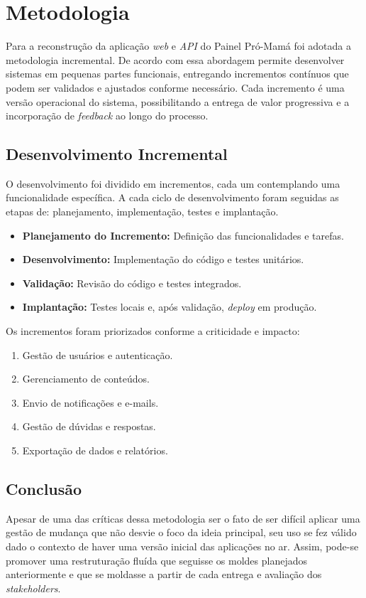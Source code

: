 \chapter{Metodologia}

Para a reconstrução da aplicação \emph{web} e \emph{API} do Painel Pró-Mamá foi adotada a metodologia incremental. De acordo com  essa abordagem permite desenvolver sistemas em pequenas partes funcionais, entregando incrementos contínuos que podem ser validados e ajustados conforme necessário. Cada incremento é uma versão operacional do sistema, possibilitando a entrega de valor progressiva e a incorporação de \emph{feedback} ao longo do processo.

\section{Desenvolvimento Incremental}

O desenvolvimento foi dividido em incrementos, cada um contemplando uma funcionalidade específica. A cada ciclo de desenvolvimento foram seguidas as etapas de: planejamento, implementação, testes e implantação.

\begin{itemize}
  \item \textbf{Planejamento do Incremento:} Definição das funcionalidades e tarefas.
  \item \textbf{Desenvolvimento:} Implementação do código e testes unitários.
  \item \textbf{Validação:} Revisão do código e testes integrados.
  \item \textbf{Implantação:} Testes locais e, após validação, \emph{deploy} em produção.
\end{itemize}

Os incrementos foram priorizados conforme a criticidade e impacto:

\begin{enumerate}
  \item Gestão de usuários e autenticação.
  \item Gerenciamento de conteúdos.
  \item Envio de notificações e e-mails.
  \item Gestão de dúvidas e respostas.
  \item Exportação de dados e relatórios.
\end{enumerate}

\section{Conclusão}

Apesar de uma das críticas dessa metodologia ser o fato de ser difícil aplicar uma gestão de mudança que não desvie o foco da ideia principal, seu uso se fez válido dado o contexto de haver uma versão inicial das aplicações no ar. Assim, pode-se promover uma restruturação fluída que seguisse os moldes planejados anteriormente e que se moldasse a partir de cada entrega e avaliação dos \emph{stakeholders}.